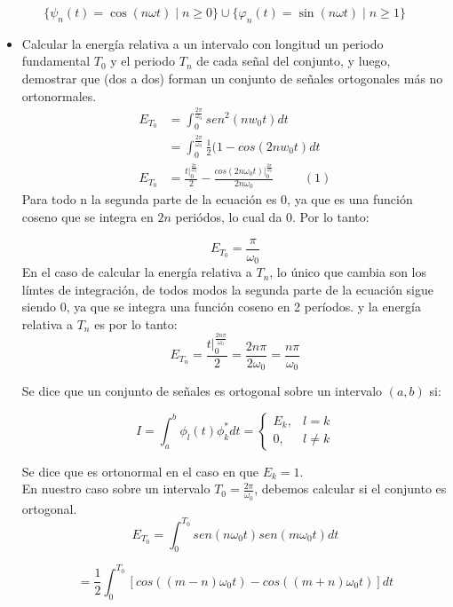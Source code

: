 \documentclass[12pt,a4paper]{report}
\begin{document}
\begin{enumerate}[label=\alph*),left=0pt]
  $$\{\psi_n(t) = \cos(n\omega t) \mid n \geq 0\} \cup \{\varphi_n(t) = \sin(n\omega t) \mid n \geq 1\}$$

    \begin{itemize}[left=0pt]
    \item Calcular la energía relativa a un intervalo con longitud un periodo fundamental $T_0$ y el periodo $T_n$
      de cada señal del conjunto, y luego, demostrar que (dos a dos) forman un conjunto de señales ortogonales más no
      ortonormales.
	$$
	\begin{aligned}	
			E_{T_0}&=\int^{\frac{2\pi}{\omega_0}}_0 sen^2(nw_0t)dt
			\\
			&=\int^{\frac{2\pi}{\omega_0}}_0\frac{1}{2}(1-cos(2nw_0t)dt\\
			E_{T_0}&=\frac{t|^{\frac{2\pi}{\omega_0}}_0}{2}-\frac{cos(2n\omega_0t)|^{\frac{2\pi}{\omega_0}}_0}{2n\omega_0}\hspace{1cm}(1)
	\end{aligned}
	$$
  Para todo n la segunda parte de la ecuación es 0, ya que es una función coseno que se integra en $2n$ periódos, lo cual da 0. Por lo tanto:

        $$
        E_{T_0}=\frac{\pi}{\omega_0}
        $$
        En el caso de calcular la energía relativa a $T_n$, lo único que cambia son los límtes 
    	de integración, de todos modos la segunda parte de la ecuación sigue siendo 0, ya que se 
	integra una función coseno en 2 períodos. y la energía relativa a $T_n$ es por lo tanto:
        $$
        E_{T_n}=\frac{t|^{\frac{2n\pi}{\omega_0}}_0}{2}=\frac{2n\pi}{2\omega_0}=\frac{n\pi}{\omega_0}
        $$

        Se dice que un conjunto de señales es ortogonal sobre un intervalo $(a,b)$ si:
        
        $$
        I=\int^b_a\phi_l(t)\phi^*_kdt=\begin{cases}
            E_k,& l=k\\
            0, & l\neq k
        \end{cases}
        $$
        
        Se dice que es ortonormal en el caso en que $E_k=1$.
        \\
        
        En nuestro caso sobre un intervalo $T_0=\frac{2\pi}{\omega_0}$, debemos calcular si el conjunto es ortogonal.
        $$
        E_{T_0}=\int_0^{T_0}sen(n\omega_0t)sen(m\omega_0t)dt
        $$
        
        $$
        =\frac{1}{2}\int_0^{T_0}[cos((m-n)\omega_0 t)-cos((m+n)\omega_0 t)]dt
        $$


\end{itemize}
\end{enumerate}
\end{document}
